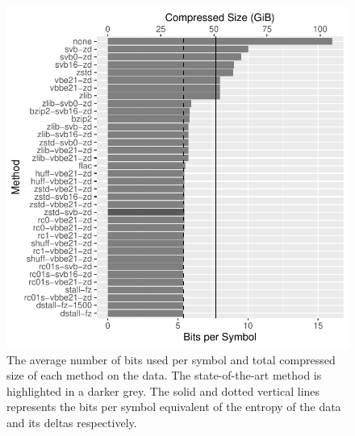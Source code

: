 \begin{figure}
\centering
%
\includegraphics[scale=0.9]{plots/reads.blow5.test.bps.bar.pdf}
\caption{\label{fig:results-bps}The average number of bits used per symbol and
	total compressed size of each method on the data. The state-of-the-art
	method is highlighted in a darker grey. The solid and dotted vertical
	lines represents the bits per symbol equivalent of the entropy of the
	data and its deltas respectively.}
\end{figure}
